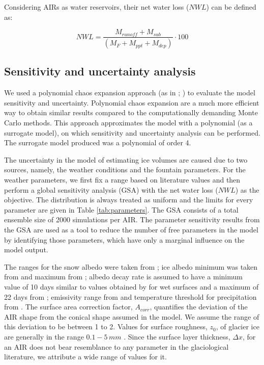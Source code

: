 \documentclass[utf8]{frontiersSCNS} %
\begin{document}
Considering AIRs as water reservoirs, their net water loss ($NWL$) can be defined as:

\begin{equation} \textit{NWL} = \frac{M_{runoff}+M_{sub}}{(M_F+M_{ppt}+M_{dep})} \cdot 100 \end{equation}

\subsection{Sensitivity and uncertainty analysis}

We used a polynomial chaos expansion approach (as in \cite{uncertainpy_2018}; \cite{Xiu_2005}) to evaluate the
model sensitivity and uncertainty. Polynomial chaos expansion are a much more efficient way to obtain similar
results compared to the computationally demanding Monte Carlo methods. This approach approximates the model with a
polynomial (as a surrogate model), on which sensitivity and uncertainty analysis can be performed.  The surrogate
model produced was a polynomial of order 4.

The uncertainty in the model of estimating ice volumes are caused due to two sources, namely, the weather
conditions and the fountain parameters. For the weather parameters, we first fix a range based on literature values
and then perform a global sensitivity analysis (GSA) with the net water loss ($NWL$) as the objective. The
distribution is always treated as uniform and the limits for every parameter are given in Table
\ref{tab:parameters}. The GSA consists of a total ensemble size of 2000 simulations per AIR. The parameter
sensitivity results from the GSA are used as a tool to reduce the number of free parameters in the model by
identifying those parameters, which have only a marginal influence on the model output.

The ranges for the snow albedo were taken from \cite{ZollesMaussion_2019}; ice albedo minimum was taken from
\cite{steiner_2015} and maximum from \cite{ZollesMaussion_2019}; albedo decay rate is assumed to have a minimum
value of 10 days similar to values obtained by \cite{Schmidt_2017} for wet surfaces and a maximum of 22 days from
\cite{OerlemansKnap_1998}; emissivity range from \cite{steiner_2015} and temperature threshold for precipitation
from \cite{Zhou_2010}. The surface area correction factor, $A_{corr}$, quantifies the deviation of the AIR shape
from the conical shape assumed in the model. We assume the range of this deviation to be between 1 to 2. Values for
surface roughness, $z_{0}$, of glacier ice are generally in the range $0.1-5\, mm$ \citep{BrockWillisSharp_2006}.
Since the surface layer thickness, $\Delta x$, for an AIR does not bear resemblance to any parameter in the
glaciological literature, we attribute a wide range of values for it.
\end{document}
